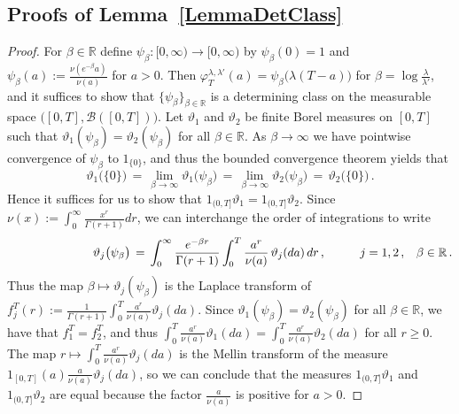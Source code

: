 \documentclass[10pt]{article}
\numberwithin{equation}{section}
\theoremstyle{definition}
\newcommand{\R}{{\mathbb R}}
\begin{document}
\subsection{Proofs of Lemma~\ref{LemmaDetClass}}\label{SubsectionLemmaDetClass}


\begin{proof} For $\beta\in \R$ define $\psi_{\beta}:[0,\infty)\rightarrow [0,\infty)$  by $\psi_{\beta}(0)=1$ and $\psi_{\beta}(a):= \frac{\nu(e^{-\beta} a)  }{ \nu( a) }$ for $a>0$.  Then $ \varphi_T^{\lambda,\lambda'}(a)=   \psi_{\beta}\big(\lambda (T-a)\big) $  for $\beta=\log\frac{\lambda}{\lambda'}$, and   it     suffices to show that $\{\psi_{\beta}\}_{\beta\in \R}$ is a determining class on the measurable space $\big([0,T],\mathscr{B}([0,T])\big)$. 
Let $\vartheta_1$ and $\vartheta_2$ be finite Borel measures on $[0,T]$ such that $\vartheta_1(\psi_{\beta})=\vartheta_2(\psi_{\beta})$ for all $\beta \in \R$.  As $\beta\rightarrow \infty$ we have pointwise convergence of $\psi_{\beta}$ to $ 1_{\{0\}}$, and thus the bounded convergence theorem yields that  
$$  \vartheta_1\big(\{ 0\} \big)\,=\, \lim_{\beta\rightarrow \infty } \vartheta_1\big(\psi_{\beta}\big)   \,=\,\lim_{\beta\rightarrow \infty } \vartheta_2\big(\psi_{\beta}\big)\,=\, \vartheta_2\big(\{ 0\} \big)\,.   $$
Hence it suffices for us to show that $1_{(0,T]}\vartheta_1=1_{(0,T]}\vartheta_2$.  Since $\nu(x):=\int_0^{\infty}\frac{  x^r }{\Gamma(r+1)}  dr$,  we can interchange the order of integrations to write
$$\text{}\hspace{2.5cm} \vartheta_j\big(\psi_{\beta}\big)\,=\,\int_{0}^{\infty} \frac{e^{-\beta r}}{\Gamma(r+1)} \int_0^T \frac{a^r  }{ \nu(a) }\,\vartheta_j(da) \,dr\,,  \hspace{1cm} j=1,2 \,, \hspace{.3cm}\beta\in \R\,.     $$
Thus the map $\beta \mapsto \vartheta_j(\psi_{\beta})$ is the Laplace transform of $ f^T_j(r):=  \frac{1}{\Gamma(r+1)} \int_0^T \frac{a^r  }{ \nu(a) }\vartheta_j(da)   $.  Since $\vartheta_1(\psi_{\beta})=\vartheta_2(\psi_{\beta})$ for all $\beta\in \R$, we have that $ f^T_1=f^T_2 $, and thus $\int_0^T \frac{a^r  }{ \nu(a) }\vartheta_1(da) =\int_0^T \frac{a^r  }{ \nu(a) }\vartheta_2(da) $ for all $r\geq 0$. The map $r\mapsto \int_0^T \frac{a^r  }{ \nu(a) }\vartheta_j(da)$ is the Mellin transform of the measure $  1_{[0,T]}(a)\frac{ a }{ \nu(a) } \vartheta_j(da) $, so we can conclude that the measures $1_{(0,T]}\vartheta_1$  and $1_{(0,T]}\vartheta_2$ are equal because the factor $\frac{a}{\nu(a)}$ is  positive  for $a>0$. 
\end{proof}
\end{document}
